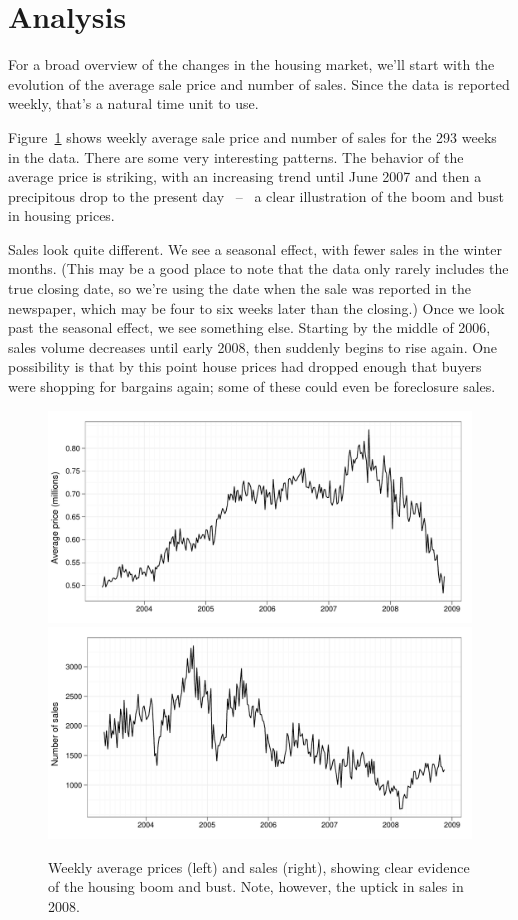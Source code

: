 \documentclass[oneside]{article}
\begin{document}
\section{Analysis}

For a broad overview of the changes in the housing market, we'll start with the evolution of the average sale price and number of sales.  Since the data is reported weekly, that's a natural time unit to use.


Figure~\ref{fig:daily} shows weekly average sale price and number of sales for the 293 weeks in the data.  There are some very interesting patterns.  The behavior of the average price is striking, with an increasing trend until June 2007 and then a precipitous drop to the present day ~--~ a clear illustration of the boom and bust in housing prices.  

Sales look quite different.  We see a seasonal effect, with fewer sales in the winter months. (This may be a good place to note that the data only rarely includes the true closing date, so we're using the date when the sale was reported in the newspaper, which may be four to six weeks later than the closing.)  Once we look past the seasonal effect, we see something else. Starting by the middle of 2006, sales volume decreases until early 2008, then suddenly begins to rise again. One possibility is that by this point house prices had dropped enough that buyers were shopping for bargains again; some of these could even be foreclosure sales.

\begin{figure}[htbp]
  \centering
    \includegraphics[width=0.5 \linewidth]{daily-price}%
    \includegraphics[width=0.5 \linewidth]{daily-sales}%
  \caption{Weekly average prices (left) and sales (right), showing clear evidence of the housing boom and bust.  Note, however, the uptick in sales in 2008.}
  \label{fig:daily}
\end{figure}
\end{document}
